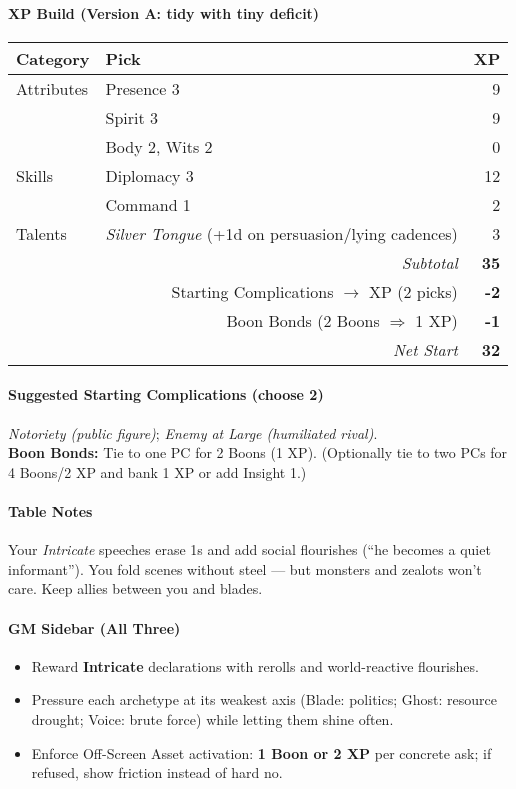 \documentclass[11pt]{book}
\begin{document}
\paragraph{XP Build (Version A: tidy with tiny deficit)}
\begin{tabular}{@{}llr@{}}
\toprule
\textbf{Category} & \textbf{Pick} & \textbf{XP} \\
\midrule
Attributes & Presence 3 & 9 \\
           & Spirit 3 & 9 \\
           & Body 2, Wits 2 & 0 \\
Skills     & Diplomacy 3 & 12 \\
           & Command 1 & 2 \\
Talents    & \emph{Silver Tongue} (+1d on persuasion/lying cadences) & 3 \\
\midrule
\multicolumn{2}{r}{\textit{Subtotal}} & \textbf{35} \\
\multicolumn{2}{r}{Starting Complications $\rightarrow$ XP (2 picks)} & \textbf{-2} \\
\multicolumn{2}{r}{Boon Bonds (2 Boons $\Rightarrow$ 1 XP)} & \textbf{-1} \\
\midrule
\multicolumn{2}{r}{\textit{Net Start}} & \textbf{32} \\
\bottomrule
\end{tabular}

\paragraph{Suggested Starting Complications (choose 2)}
\emph{Notoriety (public figure)}; \emph{Enemy at Large (humiliated rival)}.\\
\textbf{Boon Bonds:} Tie to one PC for 2 Boons (1 XP). (Optionally tie to two PCs for 4 Boons/2 XP and bank 1 XP or add Insight 1.)

\paragraph{Table Notes}
Your \emph{Intricate} speeches erase 1s and add social flourishes (“he becomes a quiet informant”). You fold scenes without steel — but monsters and zealots won’t care. Keep allies between you and blades.

\bigskip

\paragraph{GM Sidebar (All Three)}
\begin{itemize}
  \item Reward \textbf{Intricate} declarations with rerolls and world-reactive flourishes.
  \item Pressure each archetype at its weakest axis (Blade: politics; Ghost: resource drought; Voice: brute force) while letting them shine often.
  \item Enforce Off-Screen Asset activation: \textbf{1 Boon or 2 XP} per concrete ask; if refused, show friction instead of hard no.
\end{itemize}
\end{document}
